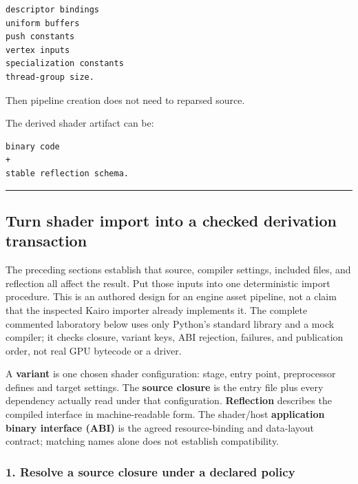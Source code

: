 \begin{verbatim}
descriptor bindings
uniform buffers
push constants
vertex inputs
specialization constants
thread-group size.
\end{verbatim}

Then pipeline creation does not need to reparsed source.

The derived shader artifact can be:

\begin{verbatim}
binary code
+
stable reflection schema.
\end{verbatim}

\begin{center}\rule{0.5\linewidth}{0.5pt}\end{center}

\subsection{Turn shader import into a checked derivation transaction}\label{05-engine-i-ch010-turn-shader-import-into-a-checked-derivation-transaction}

\hypertarget{05-engine-i-ch010-turn-shader-import-into-a-checked-derivation-transaction}{}

The preceding sections establish that source, compiler settings, included files, and reflection all affect the result. Put those inputs into one deterministic import procedure. This is an authored design for an engine asset pipeline, not a claim that the inspected Kairo importer already implements it. The complete commented laboratory below uses only Python's standard library and a mock compiler; it checks closure, variant keys, ABI rejection, failures, and publication order, not real GPU bytecode or a driver.

A \textbf{variant} is one chosen shader configuration: stage, entry point, preprocessor defines and target settings. The \textbf{source closure} is the entry file plus every dependency actually read under that configuration. \textbf{Reflection} describes the compiled interface in machine-readable form. The shader/host \textbf{application binary interface (ABI)} is the agreed resource-binding and data-layout contract; matching names alone does not establish compatibility.

\subsubsection{1. Resolve a source closure under a declared policy}\label{05-engine-i-ch010-resolve-a-source-closure-under-a-declared-policy}

